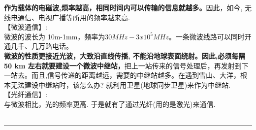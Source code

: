 \documentclass[UTF8]{ctexart}
\begin{document}
		\textbf{作为载体的电磁波,烦率越高，相同时间内可以传输的信息就越多。}因此，如今, 无线电通信、电视广播等所用的频率越来高.\\
		
		
		【微波通信】:\\
		微波的波长为 10m-1mm，频率为$30 MHz - 3x10^5 MHz$。一条微波线路可以同时开通几千、几万路电话。\\
		\textbf{微波的性质更接近光波，大致沿直线传播, 不能沿地球表面绕射。因此,必须每隔 50 km 左右就要建设一个微波中继站，}把上一站传来的信号处理后，再发射到下一站去。而且,信号传递的距离越远，需要的中继站越多。在遇到雪山、大洋，根本无法建设中继站时，该怎么办? 就利用卫星(地球同步卫星)来作为中继站. \\
		
		
		【光纤通信】:\\
		与微波相比，光的频率更高. 于是就有了通过光纤(用的是激光)来通信.\\
		
	~\\
	\hrule
	~\\
	
	
\end{document}
